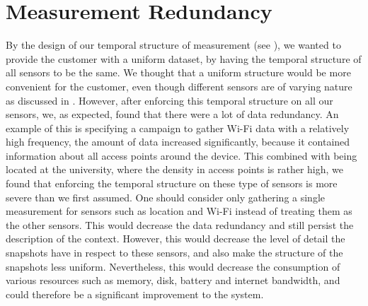 
\section{Measurement Redundancy}
\label{sec:measurement_redundancy}
By the design of our temporal structure of measurement (see ), we wanted to provide the customer with a uniform dataset, by having the temporal structure of all sensors to be the same. We thought that a uniform structure would be more convenient for the customer, even though different sensors are of varying nature as discussed in . However, after enforcing this temporal structure on all our sensors, we, as expected, found that there were a lot of data redundancy. An example of this is specifying a campaign to gather Wi-Fi data with a relatively high frequency, the amount of data increased significantly, because it contained information about all access points around the device. This combined with being located at the university, where the density in access points is rather high, we found that enforcing the temporal structure on these type of sensors is more severe than we first assumed. One should consider only gathering a single measurement for sensors such as location and Wi-Fi instead of treating them as the other sensors. This would decrease the data redundancy and still persist the description of the context. However, this would decrease the level of detail the snapshots have in respect to these sensors, and also make the structure of the snapshots less uniform. Nevertheless, this would decrease the consumption of various resources such as memory, disk, battery and internet bandwidth, and could therefore be a significant improvement to the system. 